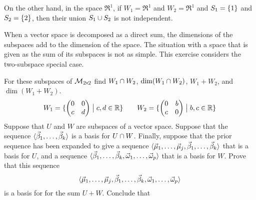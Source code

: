 \begin{exercises}
\begin{answer}
\begin{exparts}
          On the other hand, in the space $\Re^1$, 
          if \( W_1=\Re^1 \) and \( W_2=\Re^1 \) and $S_1=\mbox{$\{1\}$}$ and
          $S_2=\mbox{$\{2\}$}$, then their union $S_1\cup S_2$ is not independent.
      \end{exparts}  
     \end{answer}
  \item \label{exer:BasesSumTwoSubs}
    When a vector space is decomposed as a direct sum, the dimensions
    of the subspaces add to the dimension of the space.
    The situation with a space that is given as the sum of its subspaces 
    is not as simple.
    This exercise considers the two-subspace special case.
    \begin{exparts}
      \partsitem For these subspaces of \( \mathcal{M}_{2 \! \times \! 2} \) find
        \( W_1\cap W_2 \), \( \dim(W_1\cap W_2) \),
        \( W_1+W_2 \), and \( \dim(W_1+W_2) \).
        \begin{equation*}
          W_1=\mbox{$\{\begin{pmatrix}
                    0  &0  \\
                    c  &d
                  \end{pmatrix} \bigm| c,d\in\mathbb{R}  \}$}
          \qquad
         W_2=\mbox{$\{\begin{pmatrix}
                    0  &b  \\
                    c  &0
                  \end{pmatrix} \bigm| b,c\in\mathbb{R}  \}$}
       \end{equation*}
     \partsitem Suppose that \( U \) and \( W \) are subspaces 
       of a vector space.
       Suppose that the sequence 
       \( \langle\vec{\beta}_1,\dots,\vec{\beta}_k\rangle \) 
       is a basis for
       \( U\cap W \).
       Finally, suppose that the prior sequence has been expanded to give
       a sequence \( \langle\vec{\mu}_1,\dots,\vec{\mu}_j,
       \vec{\beta}_1,\dots,\vec{\beta}_k\rangle \)
       that is a basis for \( U \), and a sequence
       \( \langle\vec{\beta}_1,\dots,\vec{\beta}_k,
          \vec{\omega}_1,\dots,\vec{\omega}_p\rangle \)
       that is a basis for \( W \). 
       Prove that this sequence
       \begin{equation*}
         \langle\vec{\mu}_1,\dots,\vec{\mu}_j,
              \vec{\beta}_1,\dots,\vec{\beta}_k,
              \vec{\omega}_1,\dots,\vec{\omega}_p\rangle
       \end{equation*}
       is a basis for for the sum \( U+W \).
      \partsitem Conclude that 

\end{exparts}
\end{exercises}
